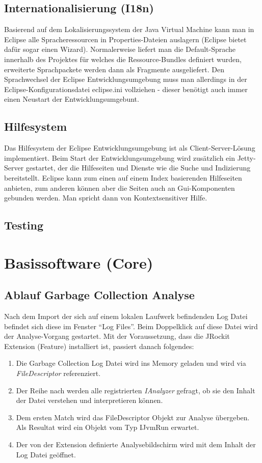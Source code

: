 \subsection{Internationalisierung (I18n)}
Basierend auf dem Lokalisierungssystem der Java Virtual Machine kann man in Eclipse alle Spracheressourcen in Properties-Dateien auslagern (Eclipse bietet dafür sogar einen Wizard). Normalerweise liefert man die Default-Sprache innerhalb des Projektes für welches die Ressource-Bundles definiert wurden, erweiterte Sprachpackete werden dann als Fragmente ausgeliefert. Den Sprachwechsel der Eclipse Entwicklungsumgebung muss man allerdings in der Eclipse-Konfigurationsdatei eclipse.ini vollziehen - dieser benötigt auch immer einen Neustart der Entwicklungsumgebunt.

\subsection{Hilfesystem}
Das Hilfesystem der Eclipse Entwicklungsumgebung ist als Client-Server-Lösung implementiert. Beim Start der Entwicklungsumgebung wird zusätzlich ein Jetty-Server gestartet, der die Hilfeseiten und Dienste wie die Suche und Indizierung bereitstellt. Eclipse kann zum einen auf einem Index basierenden Hilfeseiten anbieten, zum anderen können aber die Seiten auch an Gui-Komponenten gebunden werden. Man spricht dann von Kontextsensitiver Hilfe.

\subsection{Testing}

\section{Basissoftware (Core)}
\subsection{Ablauf Garbage Collection Analyse}
Nach dem Import der sich auf einem lokalen Laufwerk befindenden Log Datei befindet sich diese im Fenster ``Log Files''. Beim Doppelklick auf diese Datei wird der Analyse-Vorgang gestartet. Mit der Voraussetzung, dass die JRockit Extension (Feature) installiert ist, passiert danach folgendes:
\begin{enumerate}
	\item Die Garbage Collection Log Datei wird ins Memory geladen und wird via \textit{FileDescriptor} referenziert.
	\item Der Reihe nach werden alle registrierten \textit{IAnalyzer} gefragt, ob sie den Inhalt der Datei verstehen und interpretieren können. 
	\item Dem ersten Match wird das FileDescriptor Objekt zur Analyse übergeben. Als Resultat wird ein Objekt vom Typ IJvmRun erwartet. 
	\item Der von der Extension definierte Analysebildschirm wird mit dem Inhalt der Log Datei geöffnet.
\end{enumerate}
